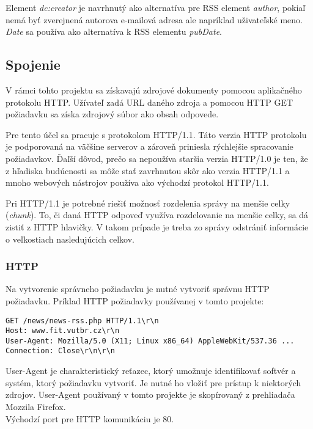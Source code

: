 \documentclass[11pt,a4paper]{article}
\begin{document}
Element \textit{dc:creator} je navrhnutý ako alternatíva pre RSS element \textit{author}, pokiaľ nemá byť zverejnená autorova e-mailová adresa ale napríklad uživateľské meno. \textit{Date} sa používa ako alternatíva k RSS elementu \textit{pubDate}.

\subsection{Spojenie}

V rámci tohto projektu sa získavajú zdrojové dokumenty pomocou aplikačného protokolu HTTP.
Užívateľ zadá URL daného zdroja a pomocou HTTP GET požiadavku sa získa zdrojový
súbor ako obsah odpovede.

Pre tento účel sa pracuje s protokolom HTTP/1.1. Táto verzia HTTP protokolu je podporovaná na väčšine serverov a zároveň priniesla rýchlejšie spracovanie požiadavkov. Ďaľší dôvod, prečo sa nepoužíva staršia verzia HTTP/1.0 je ten, že z hľadiska budúcnosti sa môže stať zavrhnutou skôr ako verzia HTTP/1.1 a mnoho webových nástrojov používa ako východzí protokol HTTP/1.1.

Pri HTTP/1.1 je potrebné riešiť možnosť rozdelenia správy na menšie celky (\textit{chunk}). To, či daná HTTP odpoveď využíva rozdelovanie na menšie celky, sa dá zistiť z HTTP hlavičky.
V takom prípade je treba zo správy odstrániť informácie o veľkostiach nasledujúcich celkov.

\subsubsection{HTTP}

Na vytvorenie správneho požiadavku je nutné vytvoriť správnu HTTP požiadavku.
Príklad HTTP požiadavky používanej v tomto projekte: 

\begin{verbatim}
GET /news/news-rss.php HTTP/1.1\r\n
Host: www.fit.vutbr.cz\r\n
User-Agent: Mozilla/5.0 (X11; Linux x86_64) AppleWebKit/537.36 ...
Connection: Close\r\n\r\n
\end{verbatim}

User-Agent je charakteristický reťazec, ktorý umožnuje identifikovať softvér a systém, ktorý požiadavku vytvoriť. Je nutné ho vložiť pre prístup k niektorých zdrojov. User-Agent používaný v tomto projekte je skopírovaný z prehliadača Mozzila Firefox.\\

\noindent Východzí port pre HTTP komunikáciu je 80.
\end{document}
